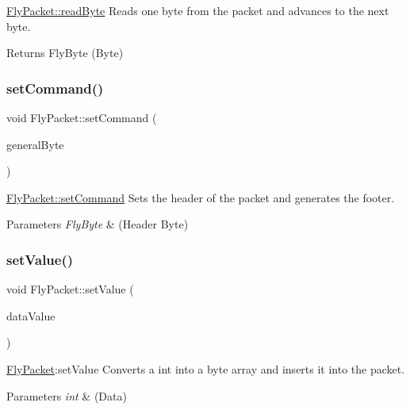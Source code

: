 \hyperlink{class_fly_packet_af3e863f81ee5de3fb73ec200efac0924}{Fly\+Packet\+::read\+Byte} Reads one byte from the packet and advances to the next byte. 

\begin{DoxyReturn}{Returns}
Fly\+Byte (Byte) 
\end{DoxyReturn}
\hypertarget{class_fly_packet_aa0693a87a15559c8d88613463805c532}{}\label{class_fly_packet_aa0693a87a15559c8d88613463805c532} 
\subsubsection{\texorpdfstring{set\+Command()}{setCommand()}}
{\footnotesize\ttfamily void Fly\+Packet\+::set\+Command (\begin{DoxyParamCaption}\item[{Fly\+Byte}]{general\+Byte }\end{DoxyParamCaption})}



\hyperlink{class_fly_packet_aa0693a87a15559c8d88613463805c532}{Fly\+Packet\+::set\+Command} Sets the header of the packet and generates the footer. 


\begin{DoxyParams}{Parameters}
{\em Fly\+Byte} & (Header Byte) \\
\hline
\end{DoxyParams}
\hypertarget{class_fly_packet_ab3d6f9ed138f3938dc97a510e050f1dc}{}\label{class_fly_packet_ab3d6f9ed138f3938dc97a510e050f1dc} 
\subsubsection{\texorpdfstring{set\+Value()}{setValue()}\hspace{0.1cm}{\footnotesize\ttfamily [1/2]}}
{\footnotesize\ttfamily void Fly\+Packet\+::set\+Value (\begin{DoxyParamCaption}\item[{int}]{data\+Value }\end{DoxyParamCaption})}



\hyperlink{class_fly_packet}{Fly\+Packet}\+:set\+Value Converts a int into a byte array and inserts it into the packet. 


\begin{DoxyParams}{Parameters}
{\em int} & (Data) \\
\hline
\end{DoxyParams}
\hypertarget{class_fly_packet_a4735fdfc7443640f35b298f5798aab99}{}\label{class_fly_packet_a4735fdfc7443640f35b298f5798aab99} 

